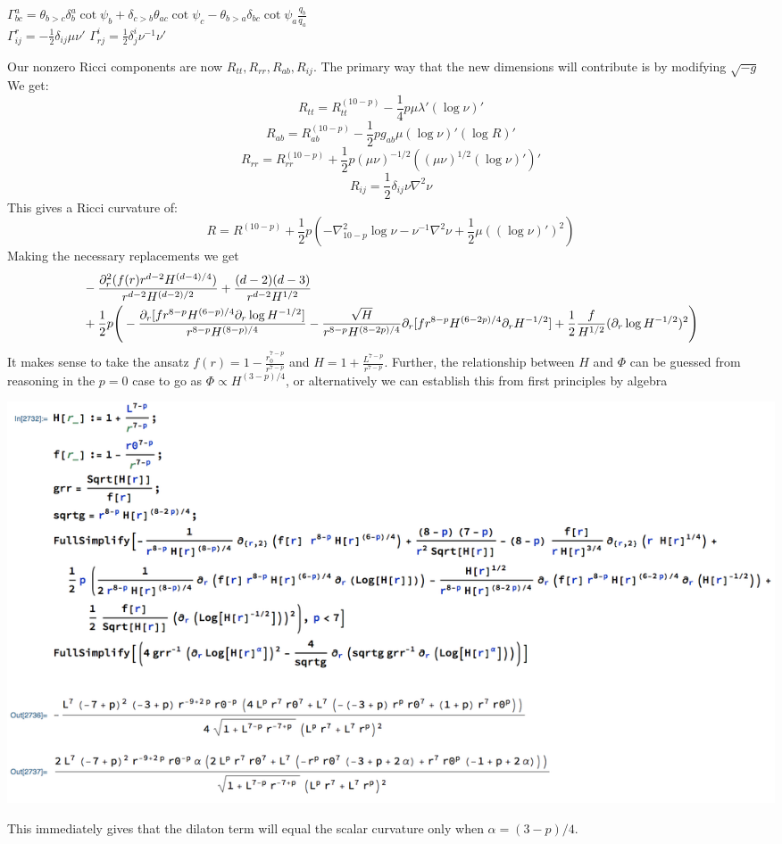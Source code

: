 \documentclass[11pt, class=article, crop=false]{standalone}
\begin{document}
\begin{enumerate}
\begin{center}
		$\Gamma^{a}_{bc} = \theta_{b>c} \delta^a_b \cot \psi_b +  \delta_{c>b} \theta_{ac} \cot \psi_c - \theta_{b>a} \delta_{bc} \cot \psi_a \frac{q_b}{q_a}$\\
		$\Gamma^r_{ij} = -\frac12 \delta_{ij} \mu \nu'$  \qquad $\Gamma^i_{rj} = \frac12 \delta^i_j \nu^{-1} \nu'$
	\end{center}
	Our nonzero Ricci components are now $R_{tt}, R_{rr}, R_{ab}, R_{ij}$. The primary way that the new dimensions will contribute is by modifying $\sqrt{-g}$ We get:
	\[
		R_{tt} = R_{tt}^{(10-p)} - \frac14 p \mu \lambda' (\log \nu)'
	\]
	\[
		R_{ab} = R_{ab}^{(10-p)} - \frac12 p g_{ab} \mu (\log \nu)' (\log R)'
	\]
	\[
		R_{rr} = R_{rr}^{(10-p)} + \frac12 p (\mu \nu)^{-1/2} ((\mu \nu)^{1/2} (\log \nu)')'
	\]
	\[
		R_{ij} =  \frac12 \delta_{ij} \nu \nabla^2 \nu
	\]
	This gives a Ricci curvature of:
	\[
		R = R^{(10-p)} + \frac12 p (-\nabla^2_{10-p} \log \nu - \nu^{-1} \nabla^2 \nu + \frac12 \mu ((\log \nu)')^2)
	\]
	Making the necessary replacements we get
	\[
	\begin{aligned}
		&- \frac{\partial_r^2 (f(r) r^{d-2} H^{(d-4)/4})}{r^{d-2} H^{(d-2)/2}} + \frac{(d-2) (d-3)}{r^{d-2} H^{1/2}}\\
		& + \frac12 p \Bigg(-\frac{\partial_r [f r^{8-p} H^{(6-p)/4} \partial_r \log H^{-1/2}]}{r^{8-p} H^{(8-p)/4}}  - \frac{\sqrt{H}}{r^{8-p} H^{(8-2p)/4}} \partial_r [f r^{8-p} H^{(6-2p)/4} \partial_r H^{-1/2} ]  + \frac12 \frac{f}{H^{1/2}} (\partial_r \log H^{-1/2})^2  \Bigg)
	\end{aligned}
	\]
	It makes sense to take the ansatz $f(r) = 1 - \frac{r_0^{7-p}}{r^{7-p}}$ and $H = 1 + \frac{L^{7-p}}{r^{7-p}}$. Further, the relationship between $H$ and $\Phi$ can be guessed from reasoning in the $p = 0$ case to go as $\Phi \propto H^{(3-p)/4}$, or alternatively we can establish this from first principles by algebra
	\begin{center}
		\includegraphics[scale=0.5]{"Figures/nonextremal2"}
	\end{center}
	This immediately gives that the dilaton term will equal the scalar curvature only when $\alpha = (3-p)/4$.
	

\end{enumerate}
\end{document}
